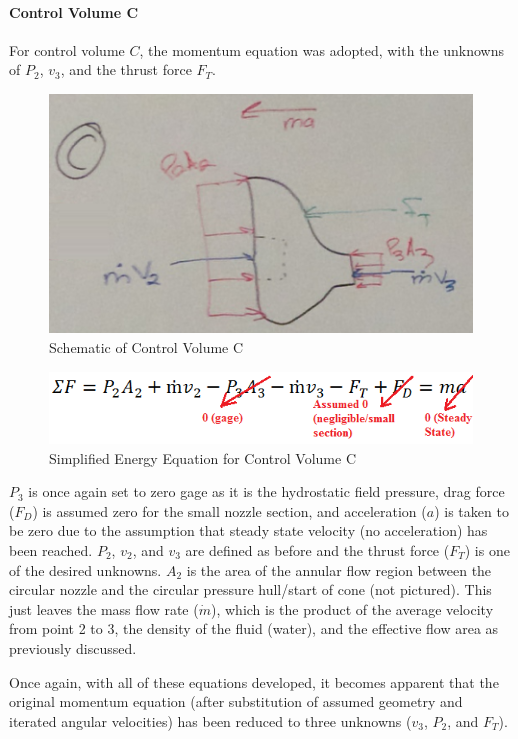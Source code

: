 \documentclass{report}
\begin{document}
\paragraph{Control Volume C}\par
For control volume $C$, the momentum equation was adopted, with the unknowns of $P_2$, $v_3$, and the thrust force $F_T$.
\begin{figure}[H]
\centering
\includegraphics{"Control Volume C"}
\caption{Schematic of Control Volume C}
\end{figure}
\begin{figure}[H]
\centering
\includegraphics{"Eqn C"}
\caption{Simplified Energy Equation for Control Volume C}
\end{figure}
$P_3$ is once again set to zero gage as it is the hydrostatic field pressure, drag force ($F_D$) is assumed zero for the small nozzle section, and acceleration ($a$) is taken to be zero due to the assumption that steady state velocity (no acceleration) has been reached.  $P_2$, $v_2$, and $v_3$ are defined as before and the thrust force ($F_T$) is one of the desired unknowns.  $A_2$ is the area of the annular flow region between the circular nozzle and the circular pressure hull/start of cone (not pictured).  This just leaves the mass flow rate ($\dot{m}$), which is the product of the average velocity from point 2 to 3, the density of the fluid (water), and the effective flow area as previously discussed.\par
Once again, with all of these equations developed, it becomes apparent that the original momentum equation (after substitution of assumed geometry and iterated angular velocities) has been reduced to three unknowns ($v_3$, $P_2$, and $F_T$).
\end{document}
